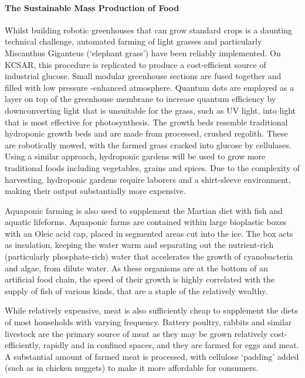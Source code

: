 \documentclass[fleqn,10pt]{Stylesheet} %
\begin{document}
\paragraph{The Sustainable Mass Production of Food}

Whilst building robotic greenhouses that can grow standard crops is a daunting technical challenge, automated farming of light grasses and particularly Miscanthus Giganteus (‘elephant grass’) have been reliably implemented. On KCSAR, this procedure is replicated to produce a cost-efficient source of industrial glucose. Small modular greenhouse sections are fused together and filled with low pressure -enhanced atmosphere. Quantum dots are employed as a layer on top of the greenhouse membrane to increase quantum efficiency by downconverting light that is unsuitable for the grass, such as UV light, into light that is most effective for photosynthesis. The growth beds resemble traditional hydroponic growth beds and are made from processed, crushed regolith. These are robotically mowed, with the farmed grass cracked into glucose by cellulases. Using a similar approach, hydroponic gardens will be used to grow more traditional foods including vegetables, grains and spices. Due to the complexity of harvesting, hydroponic gardens require laborers and a shirt-sleeve environment, making their output substantially more expensive.

Aquaponic farming is also used to supplement the Martian diet with fish and aquatic lifeforms. Aquaponic farms are contained within large bioplastic boxes with an Oleic acid cap, placed in segmented areas cut into the ice. The box acts as insulation, keeping the water warm and separating out the nutrient-rich (particularly phosphate-rich) water that accelerates the growth of cyanobacteria and algae, from dilute water. As these organisms are at the bottom of an artificial food chain, the speed of their growth is highly correlated with the supply of fish of various kinds, that are a staple of the relatively wealthy. 

While relatively expensive, meat is also sufficiently cheap to supplement the diets of most households with varying frequency. Battery poultry, rabbits and similar livestock are the primary source of meat as they may be grown relatively cost-efficiently, rapidly and in confined spaces, and they are farmed for eggs and meat. A substantial amount of farmed meat is processed, with cellulose ‘padding’ added (such as in chicken nuggets) to make it more affordable for consumers. 
\end{document}
